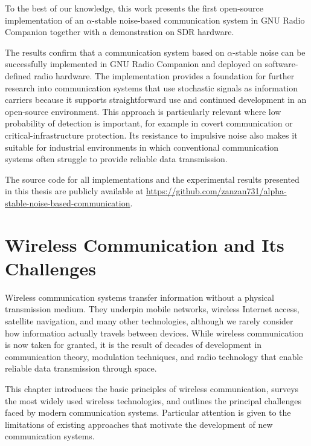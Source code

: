 \documentclass[a4paper, 12pt, openany]{book}
\begin{document}
To the best of our knowledge, this work presents the first open-source implementation of an $\alpha$-stable noise-based communication system in GNU Radio Companion together with a demonstration on SDR hardware.

The results confirm that a communication system based on $\alpha$-stable noise can be successfully implemented in GNU Radio Companion and deployed on software-defined radio hardware. The implementation provides a foundation for further research into communication systems that use stochastic signals as information carriers because it supports straightforward use and continued development in an open-source environment. This approach is particularly relevant where low probability of detection is important, for example in covert communication or critical-infrastructure protection. Its resistance to impulsive noise also makes it suitable for industrial environments in which conventional communication systems often struggle to provide reliable data transmission.

The source code for all implementations and the experimental results presented in this thesis are publicly available at \url{https://github.com/zanzan731/alpha-stable-noise-based-communication}.

\chapter{Wireless Communication and Its Challenges}
\label{ch0}

Wireless communication systems transfer information without a physical transmission medium. They underpin mobile networks, wireless Internet access, satellite navigation, and many other technologies, although we rarely consider how information actually travels between devices. While wireless communication is now taken for granted, it is the result of decades of development in communication theory, modulation techniques, and radio technology that enable reliable data transmission through space.

This chapter introduces the basic principles of wireless communication, surveys the most widely used wireless technologies, and outlines the principal challenges faced by modern communication systems. Particular attention is given to the limitations of existing approaches that motivate the development of new communication systems.
\end{document}

